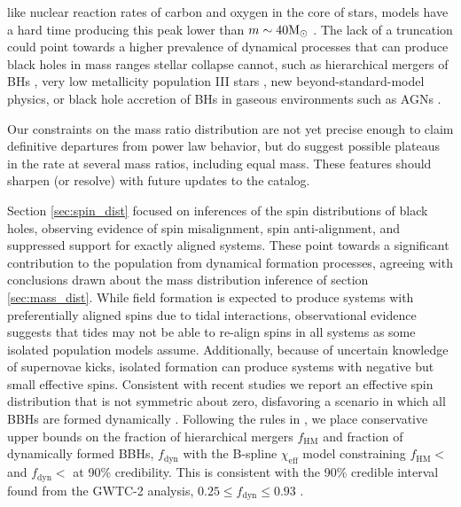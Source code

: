 like nuclear reaction rates of carbon and oxygen in the core of stars, models have a hard time producing this peak lower than $m\sim40{\rm M}_\odot$ \citep{Belczynski_2016,Marchant_2019,Renzo_2020,Farmer_2019,Farmer_2020}. The lack of a truncation could 
point towards a higher prevalence of dynamical processes that can produce black holes in mass ranges stellar collapse cannot, such as hierarchical mergers of BHs \citep{Fishbach_2017,Doctor_2020,Kimball_genealogy,kimball2020evidence,doctor2021black,Fishbach_2022}, 
very low metallicity population III stars \citep{Belczynski_2020,Farrell_2020}, new beyond-standard-model physics\citep{Croon_newphysics,Sakstein_2020}, or black hole accretion of BHs in gaseous environments such as AGNs \citep{Secunda_2020,McKernan_2020,cruzosorio2021gw190521}. 

Our constraints on the mass ratio distribution are not yet precise enough to claim definitive departures from power law behavior, but do suggest possible plateaus in the rate at several mass ratios, including equal mass.  These features should sharpen (or resolve) with future updates to the catalog.

Section \ref{sec:spin_dist} focused on inferences of the spin distributions of black holes, observing evidence of spin misalignment, spin anti-alignment, and suppressed support 
for exactly aligned systems. These point towards a significant contribution to the population from dynamical formation processes, agreeing with 
conclusions drawn about the mass distribution inference of section \ref{sec:mass_dist}. While field formation is expected to produce systems with preferentially 
aligned spins due to tidal interactions, observational evidence suggests that tides may not be able to re-align spins in all systems as some 
isolated population models assume. Additionally, because of uncertain knowledge of supernovae kicks, isolated formation can produce systems with negative but small effective spins. 
Consistent with recent studies we report an effective spin distribution that is not symmetric about zero, disfavoring a scenario in which all BBHs are formed dynamically \citep{o3a_pop,o3b_astro_dist,Callister_NoEvidence}. 
Following the rules in \citet{Fishbach_2022}, 
we place conservative upper bounds on the fraction of hierarchical mergers $f_\mathrm{HM}$ and fraction of dynamically formed BBHs, $f_\mathrm{dyn}$ with 
the B-spline $\chi_\mathrm{eff}$ model constraining $f_\mathrm{HM} < $\result{$\macros[ChiEffective][iid][frac_hm][10th percentile]$} 
and $f_\mathrm{dyn} < $ at 90\% credibility. This is consistent with the 90\% credible interval found from the GWTC-2 analysis, $0.25\leq f_\mathrm{dyn} \leq 0.93$ \citep{o3a_pop}. 

